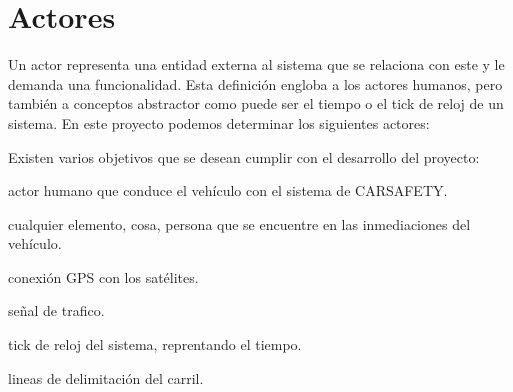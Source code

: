 \section{Actores}\label{sec:actors}

\par Un actor representa una entidad externa al sistema que se relaciona con este y le demanda una funcionalidad. Esta definición engloba a los actores humanos, pero también a conceptos abstractor como puede ser el tiempo o el tick de reloj de un sistema. En este proyecto podemos determinar los siguientes actores:
\par Existen varios objetivos que se desean cumplir con el desarrollo del proyecto:

\begin{description}[style=multiline, leftmargin=2cm]
\item[\textbf{Conductor:}] actor humano que conduce el vehículo con el sistema de CARSAFETY.
\item[\textbf{Objeto:}] cualquier elemento, cosa, persona que se encuentre en las inmediaciones del vehículo.
\item[\textbf{GPS:}] conexión GPS con los satélites.
\item[\textbf{Señal:}] señal de trafico.
\item[\textbf{Reloj:}] tick de reloj del sistema, reprentando el tiempo.
\item[\textbf{Lineas de carril:}] lineas de delimitación del carril.
\end{description}
